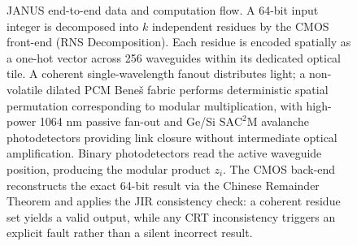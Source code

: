 \documentclass[journal]{IEEEtran}
\begin{document}
\begin{figure}[!t]

\caption{JANUS end-to-end data and computation flow. A 64-bit input integer is decomposed into $k$ independent residues by the CMOS front-end (RNS Decomposition). Each residue is encoded spatially as a one-hot vector across 256 waveguides within its dedicated optical tile. A coherent single-wavelength fanout distributes light; a non-volatile dilated PCM Bene\v{s} fabric performs deterministic spatial permutation corresponding to modular multiplication, with high-power 1064 nm passive fan-out and Ge/Si $\mathrm{SAC^2M}$ avalanche photodetectors providing link closure without intermediate optical amplification. Binary photodetectors read the active waveguide position, producing the modular product $z_i$. The CMOS back-end reconstructs the exact 64-bit result via the Chinese Remainder Theorem and applies the JIR consistency check: a coherent residue set yields a valid output, while any CRT inconsistency triggers an explicit fault rather than a silent incorrect result.}
\label{fig:janus_dataflow}
\end{figure}
\end{document}
